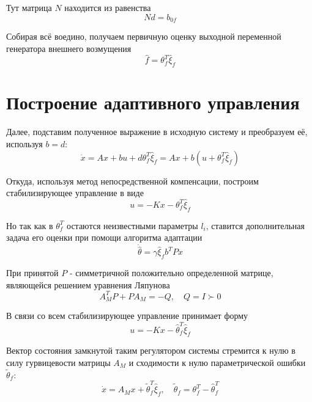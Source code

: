 \documentclass[a4paper,hidelinks,14pt]{extarticle}
\begin{document}
	Тут матрица $N$ находится из равенства
	\[
		Nd = b_{0f}
	\]

	Собирая всё воедино, получаем первичную оценку выходной переменной генератора внешнего возмущения
	\[
		\hat{f} = \theta^T_f \hat{\xi}_f
	\]

	\section{Построение адаптивного управления}
	Далее, подставим полученное выражение в исходную систему и преобразуем её, используя $b = d$:
	\[
		\dot{x} = Ax + bu + d \theta^T_f \hat{\xi}_f = Ax + b (u + \theta^T_f \hat{\xi}_f)
	\]

	Откуда, используя метод непосредственной компенсации, построим стабилизирующее управление в виде
	\[
		u = -K x - \theta^T_f \hat{\xi}_f
	\]

	Но так как в $\theta_f^T$ остаются неизвестными параметры $l_i$, ставится дополнительная задача его оценки при помощи алгоритма адаптации
	\begin{equation}
		\dot{\hat{\theta}} = \gamma \hat{\xi}_f b^T P x
	\end{equation}

	При принятой $P$ - симметричной положительно определенной матрице, являющейся решением уравнения Ляпунова
	\[
		A_M^T P + P A_M = -Q, \quad Q = I \succ 0
	\]

	В связи со всем стабилизирующее управление принимает форму
	\begin{equation}
		u = -K x - \hat{\theta}_f^T \hat{\xi}_f
	\end{equation}
	
	Вектор состояния замкнутой таким регулятором системы стремится к нулю в силу гурвицевости матрицы $A_M$ и сходимости к нулю параметрической ошибки $\tilde{\theta}_f$:
	\[
		\dot{x} = A_M x + \tilde{\theta}^T_f \hat{\xi}_f, \quad \tilde{\theta}_f = \theta_f^T - \hat{\theta}_f^T
	\]
\end{document}
